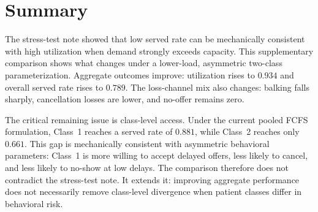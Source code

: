 \documentclass[11pt]{article}
\begin{document}
\section{Summary}

The stress-test note showed that low served rate can be mechanically consistent
with high utilization when demand strongly exceeds capacity. This supplementary
comparison shows what changes under a lower-load, asymmetric two-class
parameterization. Aggregate outcomes improve: utilization rises to $0.934$ and
overall served rate rises to $0.789$. The loss-channel mix also changes:
balking falls sharply, cancellation losses are lower, and no-offer remains zero.

The critical remaining issue is class-level access. Under the current pooled
FCFS formulation, Class~1 reaches a served rate of $0.881$, while Class~2
reaches only $0.661$. This gap is mechanically consistent with asymmetric
behavioral parameters: Class~1 is more willing to accept delayed offers, less
likely to cancel, and less likely to no-show at low delays. The comparison
therefore does not contradict the stress-test note. It extends it: improving
aggregate performance does not necessarily remove class-level divergence when
patient classes differ in behavioral risk.
\end{document}
